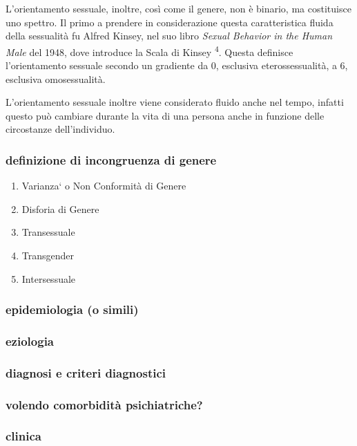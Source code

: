 \documentclass[11pt]{article}
\makeatletter
\newcommand{\cslcitation}[2]
 {\protect\hyper@linkstart{cite}{citeproc_bib_item_#1}#2\hyper@linkend}
\makeatother
\begin{document}
\begin{enumerate}
L'orientamento sessuale, inoltre, così come il genere, non è binario, ma costituisce uno spettro.
Il primo a prendere in considerazione questa caratteristica fluida della sessualità fu Alfred Kinsey, nel suo libro \emph{Sexual Behavior in the Human Male} del 1948, dove introduce la Scala di Kinsey \textsuperscript{\cslcitation{4}{4}}.
Questa definisce l'orientamento sessuale secondo un gradiente da 0, esclusiva eterossessualità, a 6, esclusiva omosessualità.

L'orientamento sessuale inoltre viene considerato fluido anche nel tempo, infatti questo può cambiare durante la vita di una persona anche in funzione delle circostanze dell'individuo.
\end{enumerate}
\subsubsection{definizione di incongruenza di genere}
\label{sec:org3dceadf}
\begin{enumerate}
\item Varianza` o Non Conformità di Genere
\label{sec:org77ca7cb}
\item Disforia di Genere
\label{sec:org561c054}
\item Transessuale
\label{sec:org30114b4}
\item Transgender
\label{sec:orgbec14ff}
\item Intersessuale
\label{sec:orgb4c8c03}
\end{enumerate}
\subsubsection{epidemiologia (o simili)}
\label{sec:org9704be3}
\subsubsection{eziologia}
\label{sec:org02538c1}
\subsubsection{diagnosi e criteri diagnostici}
\label{sec:orgd8b70e0}
\subsubsection{volendo comorbidità psichiatriche?}
\label{sec:orgb03143e}
\subsubsection{clinica}
\label{sec:org04b6681}
\end{document}
